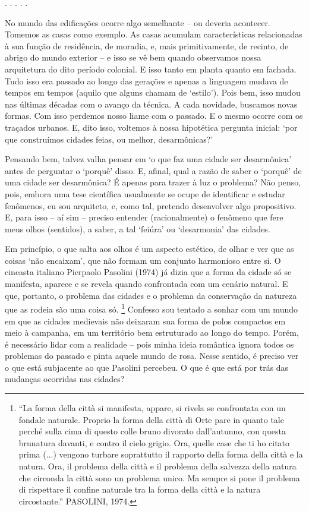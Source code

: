 \documentclass[12pt, a4paper]{book} %
\begin{document}
	        \begin{center}
		    . . . . .
	        \end{center}

            No mundo das edificações ocorre algo semelhante – ou deveria acontecer. Tomemos as casas como exemplo. As casas acumulam características relacionadas à sua função de residência, de moradia, e, mais primitivamente, de recinto, de abrigo do mundo exterior – e isso se vê bem quando observamos nossa arquitetura do dito período colonial. E isso tanto em planta quanto em fachada. Tudo isso era passado ao longo das gerações e apenas a linguagem mudava de tempos em tempos (aquilo que alguns chamam de `estilo'). Pois bem, isso mudou nas últimas décadas com o avanço da técnica. A cada novidade, buscamos novas formas. Com isso perdemos nosso liame com o passado. E o mesmo ocorre com os traçados urbanos. E, dito isso, voltemos à nossa hipotética pergunta inicial: `por que construímos cidades feias, ou melhor, desarmônicas?' 

            Pensando bem, talvez valha pensar em `o que faz uma cidade ser desarmônica' antes de perguntar o `porquê' disso. E, afinal, qual a razão de saber o `porquê' de uma cidade ser desarmônica? É apenas para trazer à luz o problema? Não penso, pois, embora uma tese científica usualmente se ocupe de identificar e estudar fenômenos, eu sou arquiteto, e, como tal, pretendo desenvolver algo propositivo. E, para isso – aí sim – preciso entender (racionalmente) o fenômeno que fere meus olhos (sentidos), a saber, a tal `feiúra' ou `desarmonia' das cidades. 
	
	        Em princípio, o que salta aos olhos é um aspecto estético, de olhar e ver que as coisas `não encaixam', que não formam um conjunto harmonioso entre si. O cineasta italiano Pierpaolo Pasolini (1974) já dizia que a forma da cidade só se manifesta, aparece e se revela quando confrontada com um cenário natural. E que, portanto, o problema das cidades e o problema da conservação da natureza que as rodeia são uma coisa só.
                \footnote[4]{“La forma della città si manifesta, appare, si rivela se confrontata con un fondale naturale. Proprio la forma della città di Orte pare in quanto tale perché sulla cima di questo colle bruno divorato dall’autunno, con questa brunatura davanti, e contro il cielo grigio. Ora, quelle case che ti ho citato prima (...) vengono turbare soprattutto il rapporto della forma della città e la natura. Ora, il problema della città e il problema della salvezza della natura che circonda la città sono un problema unico. Ma sempre si pone il problema di rispettare il confine naturale tra la forma della città e la natura circostante.” PASOLINI, 1974.} 
            Confesso sou tentado a sonhar com um mundo em que as cidades medievais não deixaram sua forma de polos compactos em meio à campanha, em um território bem estruturado ao longo do tempo. Porém, é necessário lidar com a realidade – pois minha ideia romântica ignora todos os problemas do passado e pinta aquele mundo de rosa.  Nesse sentido, é preciso ver o que está subjacente ao que Pasolini percebeu. O que é que está por trás das mudanças ocorridas nas cidades? 
\end{document}
